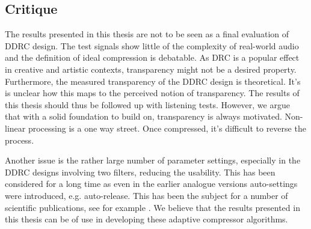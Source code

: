 \documentclass[../main2.tex]{subfiles}
\begin{document}
\subsection{Critique}\label{discussion_results}
The results presented in this thesis are not to be seen as a final evaluation of DDRC design. The test signals show little of the complexity of real-world audio and the definition of ideal compression is debatable. As DRC is a popular effect in creative and artistic contexts, transparency might not be a desired property. Furthermore, the measured transparency  of the DDRC design is theoretical. It's is unclear how this maps to the perceived notion of transparency. The results of this thesis should thus be followed up with listening tests. However, we argue that with a solid foundation to build on, transparency is always motivated. Non-linear processing is a one way street. Once compressed, it's difficult to reverse the process. 

Another issue is the rather large number of parameter settings, especially in the DDRC designs involving two filters, reducing the usability. This has been considered for a long time as even in the earlier analogue versions auto-settings were introduced, e.g. auto-release. This has been the subject for a number of scientific publications, see for example . We believe that the results presented in this thesis can be of use in developing these adaptive compressor algorithms.
\end{document}
